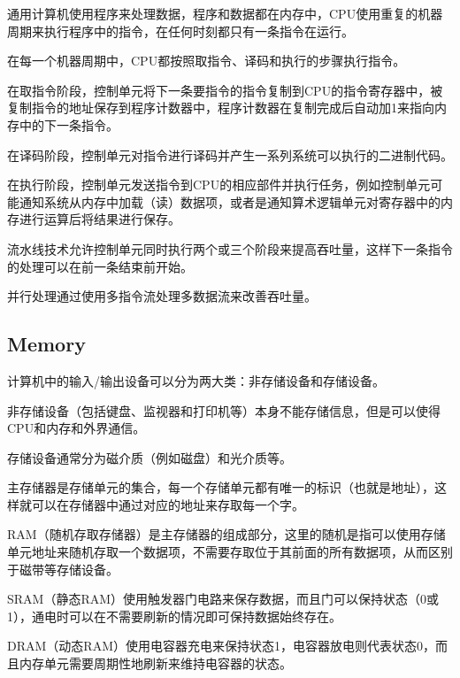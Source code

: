 通用计算机使用程序来处理数据，程序和数据都在内存中，CPU使用重复的机器周期来执行程序中的指令，在任何时刻都只有一条指令在运行。

在每一个机器周期中，CPU都按照取指令、译码和执行的步骤执行指令。


在取指令阶段，控制单元将下一条要指令的指令复制到CPU的指令寄存器中，被复制指令的地址保存到程序计数器中，程序计数器在复制完成后自动加1来指向内存中的下一条指令。

在译码阶段，控制单元对指令进行译码并产生一系列系统可以执行的二进制代码。

在执行阶段，控制单元发送指令到CPU的相应部件并执行任务，例如控制单元可能通知系统从内存中加载（读）数据项，或者是通知算术逻辑单元对寄存器中的内存进行运算后将结果进行保存。

\begin{compactitem}
\item 流水线技术允许控制单元同时执行两个或三个阶段来提高吞吐量，这样下一条指令的处理可以在前一条结束前开始。
\item 并行处理通过使用多指令流处理多数据流来改善吞吐量。
\end{compactitem}




\subsection{Memory}

计算机中的输入/输出设备可以分为两大类：非存储设备和存储设备。

\begin{compactitem}
\item 非存储设备（包括键盘、监视器和打印机等）本身不能存储信息，但是可以使得CPU和内存和外界通信。
\item 存储设备通常分为磁介质（例如磁盘）和光介质等。
\end{compactitem}



主存储器是存储单元的集合，每一个存储单元都有唯一的标识（也就是地址），这样就可以在存储器中通过对应的地址来存取每一个字。

RAM（随机存取存储器）是主存储器的组成部分，这里的随机是指可以使用存储单元地址来随机存取一个数据项，不需要存取位于其前面的所有数据项，从而区别于磁带等存储设备。

\begin{compactitem}
\item SRAM（静态RAM）使用触发器门电路来保存数据，而且门可以保持状态（0或1），通电时可以在不需要刷新的情况即可保持数据始终存在。
\item DRAM（动态RAM）使用电容器充电来保持状态1，电容器放电则代表状态0，而且内存单元需要周期性地刷新来维持电容器的状态。
\end{compactitem}

